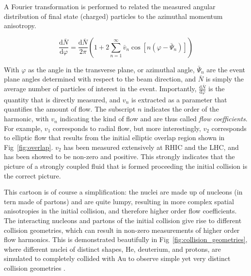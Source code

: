 A Fourier transformation is performed to related the measured angular distribution of final state (charged) particles to the azimuthal momentum anisotropy. 

  \begin{equation}
    \frac{\mathrm{d}\bar{N}}{\mathrm{d}\varphi} = \frac{\mathrm{d}\bar{N}}{2\pi} \left(1 + 2\sum^\infty_{n=1}\bar{v}_n\cos[n(\varphi - \bar\Psi_n)]\right)
  \end{equation}

  With $\varphi$ as the angle in the transverse plane, or azimuthal angle, $\bar\Psi_n$ are the event plane angles determined with respect to the beam direction, and $\bar{N}$ is simply the average number of particles of interest in the event. Importantly, $\frac{\mathrm{d}\bar{N}}{\mathrm{d}\varphi}$ is the quantity that is directly measured, and $v_n$ is extracted as a parameter that quantifies the amount of flow. The subscript $n$ indicates the order of the harmonic, with $v_n$ indicating the kind of flow and are thus called \textit{flow coefficients}. For example, $v_1$ corresponds to radial flow, but more interestingly, $v_2$ corresponds to elliptic flow that results from the initial elliptic overlap region shown in Fig~\ref{fig:overlap}. $v_2$ has been measured extensively at RHIC and the LHC, and has been showed to be non-zero and positive. This strongly indicates that the picture of a strongly coupled fluid that is formed proceeding the initial collision is the correct picture.  

  This cartoon is of course a simplification: the nuclei are made up of nucleons (in tern made of partons) and are quite lumpy, resulting in more complex spatial anisotropies in the initial collision, and therefore higher order flow coefficients. The interacting nucleons and partons of the initial collision give rise to different collision geometries, which can result in non-zero measurements of higher order flow harmonics. This is demonstrated beautifully in Fig~\ref{fig:collision_geometries}, where different nuclei of distinct shapes, He, deuterium, and protons, are simulated to completely collided with Au to observe simple yet very distinct collision geometries \cite{Aidala2019}. 
  
